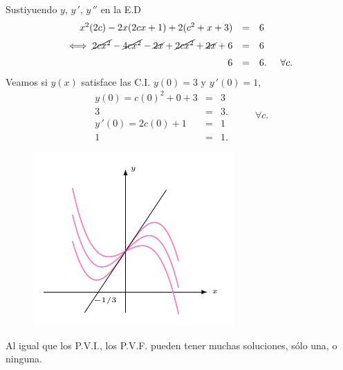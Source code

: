 \documentclass{beamer}
\begin{document}
\begin{frame}[t]
	\begin{exampleblock}{}
		Sustiyuendo \(y\), \(y\,'\), \(y\,''\) en la E.D
		\[
			\begin{array}{rcl}
				x^2(2c) -2x(2cx+1) +2(c^2+x+3) & = & 6 \\[2mm]
				\iff \cancel{2cx^2} - \cancel{4cx^2} - \cancel{2x} + \cancel{2cx^2} + \cancel{2x} + 6 & = & 6 \\[2mm]
				6 & = & 6. \hspace{5mm}\forall c.
			\end{array}
		\]
		Veamos si \(y(x)\) satisface las C.I. \(y(0) =3\) y \(y\,' (0) =1\),
		\[
			\begin{array}{rcl}
				y(0) = c(0)^2+0+3 & = & 3 \\[2mm]
				3 & = & 3. \\[2mm]
				y\,' (0) = 2c(0) +1 & = & 1 \\[2mm]
				1 & = & 1.
			\end{array} \hspace{1cm} \forall c.
		\]
	\end{exampleblock}
\end{frame}

\begin{frame}[t]
	\begin{exampleblock}{}
		\begin{figure}[hbt!]
			\centering
			\includegraphics[width= 0.7 \linewidth]{IMAGENES/6/tikz.pdf}
		\end{figure}
		Al igual que los P.V.I., los P.V.F. pueden tener muchas soluciones, sólo una, o ninguna.
	\end{exampleblock}
\end{frame}
\end{document}
